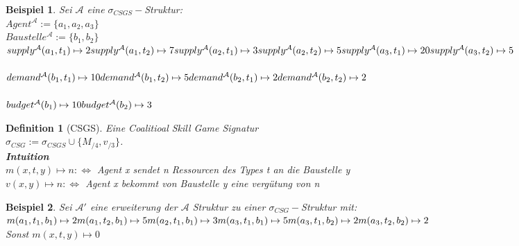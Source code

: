 \documentclass[12pt]{article}
\theoremstyle{break}
\newtheorem{definition}{Definition}
\newtheorem{bsp}{Beispiel}
\begin{document}
\begin{bsp}
  Sei $\mathcal{A}$ eine $\sigma_{CSGS}-$Struktur:\\
  $Agent^\mathcal{A} := \{a_1, a_2, a_3\}$ \\
  $Baustelle^\mathcal{A} := \{b_1, b_2\}$ \\
  $ \\
  supply^\mathcal{A}(a_1, t_1)\mapsto 2 \\
  supply^\mathcal{A}(a_1, t_2)\mapsto 7 \\
  supply^\mathcal{A}(a_2, t_1)\mapsto 3 \\
  supply^\mathcal{A}(a_2, t_2)\mapsto 5 \\
  supply^\mathcal{A}(a_3, t_1)\mapsto 20 \\
  supply^\mathcal{A}(a_3, t_2)\mapsto 5
  $ \\ \\
  $
  demand^\mathcal{A}(b_1, t_1)\mapsto 10 \\
  demand^\mathcal{A}(b_1, t_2)\mapsto 5\\
  demand^\mathcal{A}(b_2, t_1)\mapsto 2\\
  demand^\mathcal{A}(b_2, t_2)\mapsto 2
  $ \\ \\
  $
  budget^\mathcal{A}(b_1)\mapsto 10 \\
  budget^\mathcal{A}(b_2)\mapsto 3
  $ \\
\end{bsp}

\begin{definition}[CSGS]
  Eine Coalitioal Skill Game Signatur \\$\sigma_{CSG}:=\sigma_{CSGS}\cup\{M_{/4}, v_{/3}\}$.
    \\ \textbf{Intuition} \\
    $m(x, t, y)\mapsto n:\Leftrightarrow$ Agent x sendet n Ressourcen des Types t an die Baustelle y \\
    $v(x,y)\mapsto n:\Leftrightarrow$ Agent x bekommt von Baustelle y eine vergütung von n
\end{definition}


\begin{bsp}
  Sei $\mathcal{A}'$ eine erweiterung der $\mathcal{A}$ Struktur zu einer $\sigma_{CSG}-$Struktur mit:\\
  $
  m(a_1, t_1, b_1) \mapsto 2 \\
  m(a_1, t_2, b_1) \mapsto 5 \\
  m(a_2, t_1, b_1) \mapsto 3 \\
  m(a_3, t_1, b_1) \mapsto 5 \\
  m(a_3, t_1, b_2) \mapsto 2 \\
  m(a_3, t_2, b_2) \mapsto 2
  $ \\
  Sonst $m(x,t,y)\mapsto 0$
\end{bsp}
\end{document}
